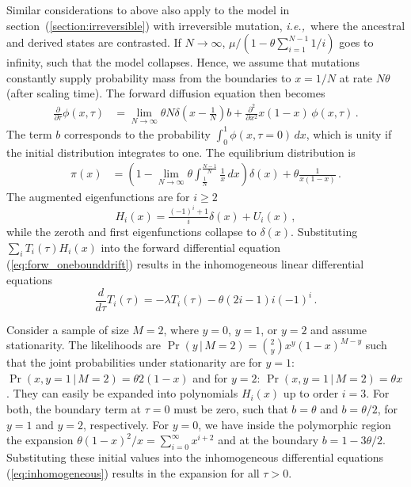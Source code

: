 \documentclass[preprint]{elsarticle}
\newcommand\given{{\,|\,}}
\newcommand\ie{{\it i.e.,}}
\begin{document}
Similar considerations to above also apply to the model in section~(\ref{section:irreversible}) with irreversible mutation, \ie\ where the ancestral and derived states are contrasted. If $N\to\infty$, $\mu/(1-\theta\sum_{i=1}^{N-1}1/i)$ goes to infinity, such that the model collapses. Hence, we assume that mutations constantly supply probability mass from the boundaries to $x=1/N$ at rate $N\theta$ (after scaling time). The forward diffusion equation then becomes
\begin{equation}\label{eq:forw_onebounddrift}
\begin{split}
\frac{\partial}{\partial \tau} \phi(x,\tau)&=
    \lim_{N\to\infty}\theta N\delta(x-\tfrac1N)b+\frac{\partial^2}{\partial x^2}x(1-x)\,\phi(x,\tau)\,.
\end{split}
\end{equation}
The term $b$ corresponds to the probability $\int_0^1\phi(x,\tau=0)\,dx$, which is unity if the initial distribution integrates to one. The equilibrium distribution is 
\begin{equation}
\begin{split}
    \pi(x)&=\left(1-\lim_{N\to\infty}\theta \int_{\tfrac1N}^{\tfrac{N-1}N} \frac1x\,dx\right)\delta(x)+\theta\frac{1}{x(1-x)}\,.
\end{split}
\end{equation}
The augmented eigenfunctions are for $i\geq 2$
\begin{equation}\label{eq:forw_onebound_eigen}
    H_i(x)=\tfrac{(-1)^i+1}{i}\delta(x)+U_i(x)\,,
\end{equation}
while the zeroth and first eigenfunctions collapse to $\delta(x)$. 
Substituting $\sum_iT_i(\tau) H_i(x)$ into the forward differential equation (\ref{eq:forw_onebounddrift}) results in the inhomogeneous linear differential equations
\begin{equation}\label{eq:inhomogeneous}
    \frac{d}{d\tau}T_i(\tau)=-\lambda T_i(\tau)-\theta (2i-1)i(-1)^i\,.
\end{equation}

Consider a sample of size $M=2$, where $y=0$, $y=1$, or $y=2$ and assume stationarity. The likelihoods are $\Pr(y\given M=2)=\binom{2}{y}x^{y}(1-x)^{M-y}$ such that the joint probabilities under stationarity are for $y=1$: $\Pr(x,y=1\given M=2)=\theta 2(1-x)$ and for $y=2$: $\Pr(x,y=1\given M=2)=\theta x$. They can easily be expanded into polynomials $H_i(x)$ up to order $i=3$. For both, the boundary term at $\tau=0$ must be zero, such that $b=\theta$ and $b=\theta/2$, for $y=1$ and $y=2$, respectively. For $y=0$, we have inside the polymorphic region the expansion $\theta (1-x)^2/x=\sum_{i=0}^\infty x^{i+2}$ and at the boundary $b=1-3\theta/2$. Substituting these initial values into the inhomogeneous differential equations (\ref{eq:inhomogeneous}) results in the expansion for all $\tau>0$.
\end{document}
